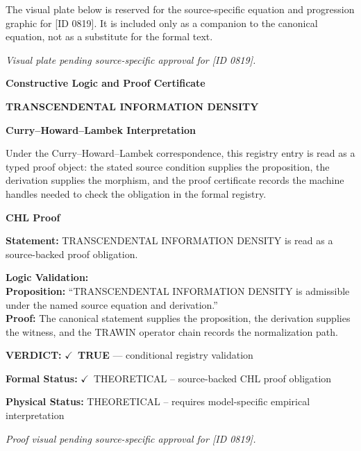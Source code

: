 \begingroup\footnotesize\sloppy
The visual plate below is reserved for the source-specific equation and progression graphic for [ID 0819]. It is included only as a companion to the canonical equation, not as a substitute for the formal text.
\par\endgroup
\begingroup\footnotesize\itshape
Visual plate pending source-specific approval for [ID 0819].
\par\endgroup

\clearpage
\begingroup\tzpsupportsetup
\noindent\textbf{\fontsize{10.8pt}{12.8pt}\selectfont [ID 0819] Constructive Logic and Proof Certificate}\par
\noindent\textbf{\fontsize{10pt}{12pt}\selectfont TRANSCENDENTAL INFORMATION DENSITY}\par
\vspace{0.45em}
\begingroup
\footnotesize
\setlength{\parskip}{0.22em}
\setlength{\parindent}{0pt}
\noindent\textbf{Curry--Howard--Lambek Interpretation}\par
Under the Curry--Howard--Lambek correspondence, this registry entry is read as a typed proof
object: the stated source condition supplies the proposition, the derivation supplies the
morphism, and the proof certificate records the machine handles needed to check the obligation
in the formal registry.

\vspace{0.45em}
\noindent\textbf{CHL Proof}\par
\textbf{Statement:} TRANSCENDENTAL INFORMATION DENSITY is read as a source-backed proof obligation.

\textbf{Logic Validation:}\\
\textbf{Proposition:} ``TRANSCENDENTAL INFORMATION DENSITY is admissible under the named source equation and derivation.''\\
\textbf{Proof:} The canonical statement supplies the proposition, the derivation supplies the witness, and the TRAWIN operator chain records the normalization path.

\textbf{VERDICT:} \ensuremath{\checkmark}\ \textbf{TRUE} --- conditional registry validation

\textbf{Formal Status:} \ensuremath{\checkmark}\ THEORETICAL -- source-backed CHL proof obligation

\textbf{Physical Status:} THEORETICAL -- requires model-specific empirical interpretation
\par\vspace{0.45em}
\par
\vfill
\begingroup\footnotesize\itshape
Proof visual pending source-specific approval for [ID 0819].
\par\endgroup
\vfill
\endgroup
\endgroup
